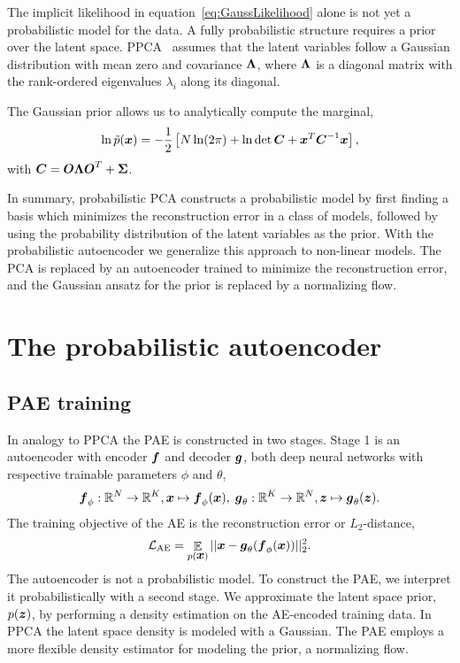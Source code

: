 \documentclass[10pt]{article} \usepackage[accepted]{tmlr}
\DeclareMathOperator{\EE}{\mathbb{E}}
\def\bi#1{\hbox{\boldmath{$#1$}}}
\begin{document}
The implicit likelihood in equation~\ref{eq:GaussLikelihood} alone is not yet a probabilistic model for the data. 
A fully probabilistic structure requires a prior over the latent space. 
PPCA~\citep{TippingBishop1999} assumes that the latent variables follow a Gaussian distribution with mean zero and covariance $\bi \Lambda$,  where $\bi \Lambda$ is a diagonal matrix with the rank-ordered eigenvalues $\lambda_i$ along its diagonal. 

The Gaussian prior allows us to analytically compute the marginal,
\begin{equation}
\label{eq:PPCA}
    \ln \tilde p(\bi{x}) = -\frac{1}{2}\left[N \ln(2\pi)+\ln \det{{\bi C}} + \bi x^T {\bi C}^{-1} \bi x\right],
\end{equation}
with ${\bi C} = \bi O \bi \Lambda \bi O^T + \bi \Sigma$.

In summary, probabilistic PCA constructs a probabilistic model by first finding a basis which minimizes 
the reconstruction error in a class of models, followed by using the probability 
distribution of the latent variables as the prior. With the probabilistic autoencoder we generalize this 
approach to non-linear models. The PCA is replaced by an autoencoder trained to minimize the reconstruction error, and the Gaussian ansatz for the prior is replaced by a normalizing flow.

\section{The probabilistic autoencoder}

\subsection{PAE training}
In analogy to PPCA the PAE is constructed in two stages. Stage 1 is an autoencoder with encoder $\bi{f}$ and decoder $\bi{g}$, both deep neural networks with respective trainable parameters $\phi$ and $\theta$,
\begin{align}
\bi{f}_\phi:  \mathbb{R}^N \to \mathbb{R}^K, \bi{x} \mapsto \bi{f}_\phi(\bi{x}),\;
\bi{g}_\theta: \mathbb{R}^K \to \mathbb{R}^N, \bi{z} \mapsto \bi{g}_\theta(\bi{z}).
\end{align}
The training objective of the AE is the reconstruction error or $L_2$-distance,
\begin{equation}
\mathcal{L}_{\mathrm{AE}} = \EE_{p({\bi{x}})}||\bi{x}-\bi g_{\theta}(\bi{f}_{\phi}(\bi{x}))||_2^2.
\label{loss_AE}
\end{equation}
The autoencoder is not a probabilistic model. To construct the PAE, we interpret it probabilistically with a second stage.
We approximate the latent space prior, $p(\bi{z})$, by performing a density estimation on the AE-encoded training data. In PPCA the latent space density is modeled with a Gaussian. The PAE employs a more flexible density estimator for modeling the prior, a normalizing flow.
\end{document}
